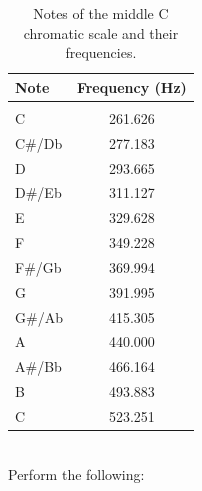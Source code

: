 \documentclass[epsfig,10pt,fullpage]{article}
\begin{document}
\begin{table}[H]
    \begin{center}
    \begin{tabular}{l|c}
            \textbf{Note} &
            \textbf{Frequency (Hz)}
				\\\hline\vspace{-3mm}\\
            C & 261.626 \\
            C\#/Db & 277.183 \\
            D & 293.665 \\
            D\#/Eb & 311.127 \\
            E & 329.628 \\
            F & 349.228 \\
            F\#/Gb & 369.994 \\
            G & 391.995 \\
            G\#/Ab & 415.305 \\
            A & 440.000 \\
            A\#/Bb & 466.164 \\
            B & 493.883 \\
            C & 523.251 \\

    \end{tabular}
    \caption{Notes of the middle C chromatic scale and their frequencies.}
	 \label{tab:tone_freqs}
    \end{center}
\end{table}

~\\
\noindent
Perform the following:
\end{document}

